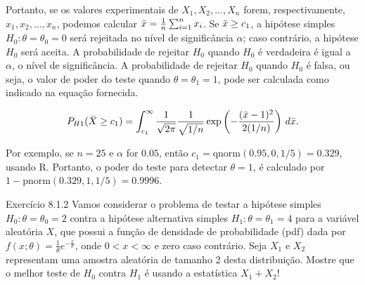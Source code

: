 \documentclass[12pt]{beamer}
\begin{document}
\begin{frame}{}
\begin{block}{}
\justifying
Portanto, se os valores experimentais de $X_1, X_2, \ldots, X_n$ forem, respectivamente, $x_1, x_2, \ldots, x_n$, podemos calcular $\Bar{x} = \frac{1}{n} \sum_{i=1}^n x_i$. Se $\Bar{x} \geq c_{1}$, a hipótese simples $H_0 : \theta = \theta_0 = 0$ será rejeitada no nível de significância $\alpha$; caso contrário, a hipótese $H_0$ será aceita. A probabilidade de rejeitar $H_0$ quando $H_0$ é verdadeira é igual a $\alpha$, o nível de significância. A probabilidade de rejeitar $H_0$ quando $H_0$ é falsa, ou seja, o valor de poder do teste quando $\theta = \theta_1 = 1$, pode ser calculada como indicado na equação fornecida.
\end{block}
\begin{block}{}
\justifying
\begin{align*}
    P_{H1}(\Bar{X} \geq c_1) = \int_{c_1}^{\infty} \frac{1}{\sqrt{2\pi}} \frac{1}{\sqrt{1/n}} \exp\left(-\frac{(\Bar{x} - 1)^2}{2(1/n)}\right) \, d\Bar{x}.
\end{align*}
\end{block}
\pause
\begin{block}{}
\justifying
Por exemplo, se $n = 25$ e $\alpha$ for $0.05$, então $c_1 = \text{qnorm}(0.95, 0, 1/5) = 0.329$, usando R. Portanto, o poder do teste para detectar $\theta = 1$, é calculado por $1 - \text{pnorm}(0.329, 1, 1/5) = 0.9996$.
\end{block}
\end{frame}


\begin{frame}{}
\begin{block}{Exercício 8.1.2}
\justifying
Vamos considerar o problema de testar a hipótese simples $H_0: \theta = \theta_0 = 2$ contra a hipótese alternativa simples $H_1: \theta = \theta_1 = 4$ para a variável aleatória $X$, que possui a função de densidade de probabilidade (pdf) dada por $f(x; \theta) = \frac{1}{\theta} e^{-\frac{x}{\theta}}$, onde $0 < x < \infty$ e zero caso contrário. Seja $X_1$ e $X_2$ representam uma amostra aleatória de tamanho 2 desta distribuição. Mostre que o melhor teste de $H_0$ contra $H_1$ é usando a estatística $X_1 + X_2$!
\end{block}
\end{frame}
\end{document}
